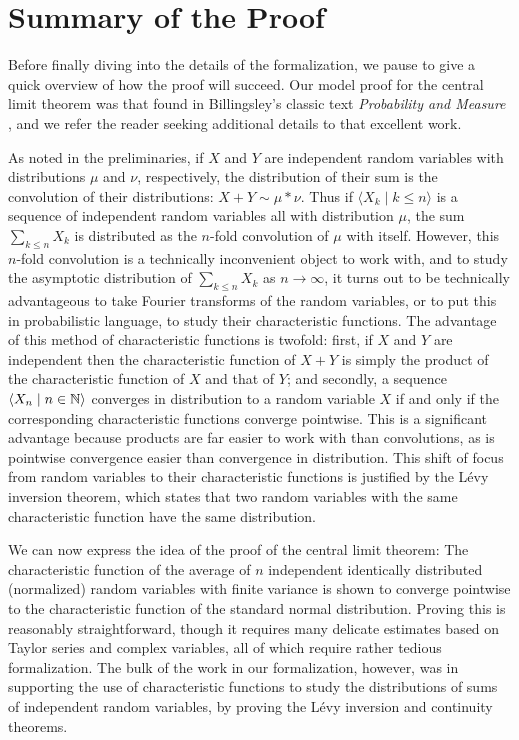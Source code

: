 \documentclass{article}
\theoremstyle{definition}
\newcommand{\bldseq}[2]{\langle{#1}\mid{#2}\rangle}
\begin{document}
\section{Summary of the Proof} \label{sec:summary}

Before finally diving into the details of the formalization, we pause to give a quick overview of how the proof will succeed. Our model proof for the central limit theorem was that found in Billingsley's classic text {\em Probability and Measure} \cite{billingsley}, and we refer the reader seeking additional details to that excellent work.

As noted in the preliminaries, if $X$ and $Y$ are independent random variables with distributions $\mu$ and $\nu$, respectively, the distribution of their sum is the convolution of their distributions: $X + Y \sim \mu * \nu$. Thus if $\bldseq{X_k}{k \le n}$ is a sequence of independent random variables all with distribution $\mu$, the sum $\sum_{k \le n} X_k$ is distributed as the $n$-fold convolution of $\mu$ with itself. However, this $n$-fold convolution is a technically inconvenient object to work with, and to study the asymptotic distribution of $\sum_{k \le n} X_k$ as $n \rightarrow \infty$, it turns out to be technically advantageous to take Fourier transforms of the random variables, or to put this in probabilistic language, to study their characteristic functions. The advantage of this method of characteristic functions is twofold: first, if $X$ and $Y$ are independent then the characteristic function of $X + Y$ is simply the product of the characteristic function of $X$ and that of $Y$; and secondly, a sequence $\bldseq{X_n}{n \in \N}$ converges in distribution to a random variable $X$ if and only if the corresponding characteristic functions converge pointwise. This is a significant advantage because products are far easier to work with than convolutions, as is pointwise convergence easier than convergence in distribution. This shift of focus from random variables to their characteristic functions is justified by the L\'evy inversion theorem, which states that two random variables with the same characteristic function have the same distribution.

We can now express the idea of the proof of the central limit theorem: The characteristic function of the average of $n$ independent identically distributed (normalized) random variables with finite variance is shown to converge pointwise to the characteristic function of the standard normal distribution. Proving this is reasonably straightforward, though it requires many delicate estimates based on Taylor series and complex variables, all of which require rather tedious formalization. The bulk of the work in our formalization, however, was in supporting the use of characteristic functions to study the distributions of sums of independent random variables, by proving the L\'evy inversion and continuity theorems.
\end{document}
